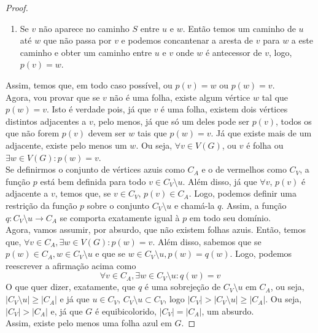 \documentclass[12pt]{article}
\begin{document}
\begin{proof}
\begin{enumerate}
\begin{enumerate}
\item Se $v$ não aparece no caminho $S$ entre $u$ e $w$. Então temos um caminho de $u$ até $w$ que não passa por $v$ e podemos concantenar a aresta de $v$ para $w$ a este caminho e obter um caminho entre $u$ e $v$ onde $w$ é antecessor de $v$, logo, $p(v) = w$.
\end{enumerate}
\end{enumerate}
Assim, temos que, em todo caso possível, ou $p(v) = w$ ou $p(w) = v$. \\
Agora, vou provar que se $v$ não é uma folha, existe algum vértice $w$ tal que $p(w) = v$. Isto é verdade pois, já que $v$ é uma folha, existem dois vértices distintos adjacentes a $v$, pelo menos, já que só um deles pode ser $p(v)$, todos os que não forem $p(v)$ devem ser $w$ tais que $p(w) = v$. Já que existe mais de um adjacente, existe pelo menos um $w$. Ou seja, $\forall v \in V(G)$, ou $v$ é folha ou $\exists w \in V(G) : p(w) = v$. \\
Se definirmos o conjunto de vértices azuis como $C_A$ e o de vermelhos como $C_V$, a função $p$ está bem definida para todo $v \in C_V \setminus u$. Além disso, já que $\forall v$, $p(v)$ é adjacente a $v$, temos que, se $v \in C_V$, $p(v) \in C_A$. Logo, podemos definir uma restrição da função $p$ sobre o conjunto $C_V \setminus u$ e chamá-la $q$. Assim, a função $q : C_V \setminus u \to C_A$ se comporta exatamente igual à $p$ em todo seu domínio. \\
Agora, vamos assumir, por absurdo, que não existem folhas azuis. Então, temos que, $\forall v \in C_A, \exists w \in V(G) : p(w) = v$. Além disso, sabemos que se $p(w) \in C_A, w \in C_V \setminus u$ e que se $w \in C_V \setminus u, p(w) = q(w)$. Logo, podemos reescrever a afirmação acima como
$$\forall v \in C_A, \exists w \in C_V \setminus u : q(w) = v$$
O que quer dizer, exatamente, que $q$ é uma sobrejeção de $C_V \setminus u$ em $C_A$, ou seja, $|C_V \setminus u| \geq |C_A|$ e já que $u \in C_V$, $C_V \setminus u \subset C_V$, logo $|C_V| > |C_V \setminus u| \geq |C_A|$. Ou seja, $|C_V| > |C_A|$ e, já que $G$ é equibicolorido, $|C_V| = |C_A|$, um absurdo. \\
Assim, existe pelo menos uma folha azul em $G$.

\end{proof}
\end{document}
